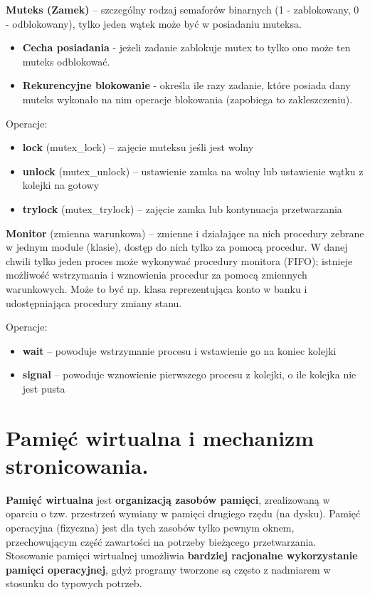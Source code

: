 \documentclass[main.tex]{subfiles}
\begin{document}
    \noindent \textbf{Muteks (Zamek)} -- szczególny rodzaj semaforów binarnych (1 - zablokowany, 0 - odblokowany), tylko
    jeden wątek może być w posiadaniu muteksa.

    \begin{itemize}[noitemsep]
        \item \textbf{Cecha posiadania} - jeżeli zadanie zablokuje mutex to tylko ono może ten muteks odblokować.
        \item \textbf{Rekurencyjne blokowanie} - określa ile razy zadanie, które posiada dany muteks wykonało na nim
        operacje blokowania (zapobiega to zakleszczeniu).
    \end{itemize}

    \noindent Operacje:
    \begin{itemize}[noitemsep]
        \item \textbf{lock} (mutex\_lock) -- zajęcie muteksu jeśli jest wolny
        \item \textbf{unlock} (mutex\_unlock) -- ustawienie zamka na wolny lub ustawienie wątku z kolejki na gotowy
        \item \textbf{trylock} (mutex\_trylock) -- zajęcie zamka lub kontynuacja przetwarzania
    \end{itemize}

    \noindent \textbf{Monitor} (zmienna warunkowa) -- zmienne i działające na nich procedury zebrane w jednym module
    (klasie), dostęp do nich tylko za pomocą procedur. W danej chwili tylko jeden proces może wykonywać procedury
    monitora (FIFO); istnieje możliwość wstrzymania i wznowienia procedur za pomocą zmiennych warunkowych.
    Może to być np. klasa reprezentująca konto w banku i udostępniająca procedury zmiany stanu.

    \noindent Operacje:
    \begin{itemize}[noitemsep]
        \item \textbf{wait} -- powoduje wstrzymanie procesu i wstawienie go na koniec kolejki
        \item \textbf{signal} -- powoduje wznowienie pierwszego procesu z kolejki, o ile kolejka nie jest pusta
    \end{itemize}


    \section{Pamięć wirtualna i mechanizm stronicowania.}

    \textbf{Pamięć wirtualna} jest \textbf{organizacją zasobów pamięci}, zrealizowaną w oparciu o tzw. przestrzeń
    wymiany w pamięci drugiego rzędu (na dysku). Pamięć operacyjna (fizyczna) jest dla tych zasobów tylko pewnym oknem,
    przechowującym część zawartości na potrzeby bieżącego przetwarzania. Stosowanie pamięci wirtualnej umożliwia
    \textbf{bardziej racjonalne wykorzystanie pamięci operacyjnej}, gdyż programy tworzone są często z nadmiarem
    w stosunku do typowych potrzeb.\\
\end{document}
